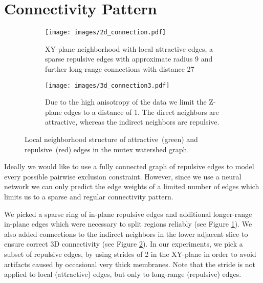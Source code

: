 \section{Connectivity Pattern}
\captionsetup[subfigure]{justification=raggedright, singlelinecheck=off}
\begin{figure}
    \centering
    \begin{subfigure}[b]{0.98 \linewidth}
    \centering
    \texttt{[image: images/2d\_connection.pdf]}%
    \caption{XY-plane neighborhood with local attractive edges,
     a sparse repulsive edges with approximate radius 9 and further long-range connections with distance 27}\label{fig:2d-connection}
    \end{subfigure}\hfill

    \begin{subfigure}[b]{0.98 \linewidth}
    \centering
    \texttt{[image: images/3d\_connection3.pdf]}
    \caption{Due to the high anisotropy of the data we limit the Z-plane edges to a distance of 1. The direct neighbors are attractive, whereas the indirect neighbors are repulsive.}\label{fig:3d-connection}
    \end{subfigure}%
    \caption{Local neighborhood structure of attractive~(green) and repulsive~(red) edges in the mutex watershed graph.}
    \label{fig:connectivity}
\end{figure}

Ideally we would like to use a fully connected graph of repulsive edges to model every possible pairwise exclusion constraint. However, since we use a neural network we can only predict the edge weights of a limited number of edges which limits us to a sparse and regular connectivity pattern.

We picked a sparse ring of in-plane repulsive edges and additional longer-range in-plane edges which were necessary to split regions reliably (see Figure \ref{fig:2d-connection}).
We also added connections to the indirect neighbors in the lower adjacent slice to ensure correct 3D connectivity (see Figure \ref{fig:3d-connection}). In our experiments, we pick a subset of repulsive edges, by using strides of 2 in the XY-plane in order to avoid artifacts caused by occasional very thick membranes. Note that the stride is not applied to local (attractive) edges, but only to long-range (repulsive) edges. 

